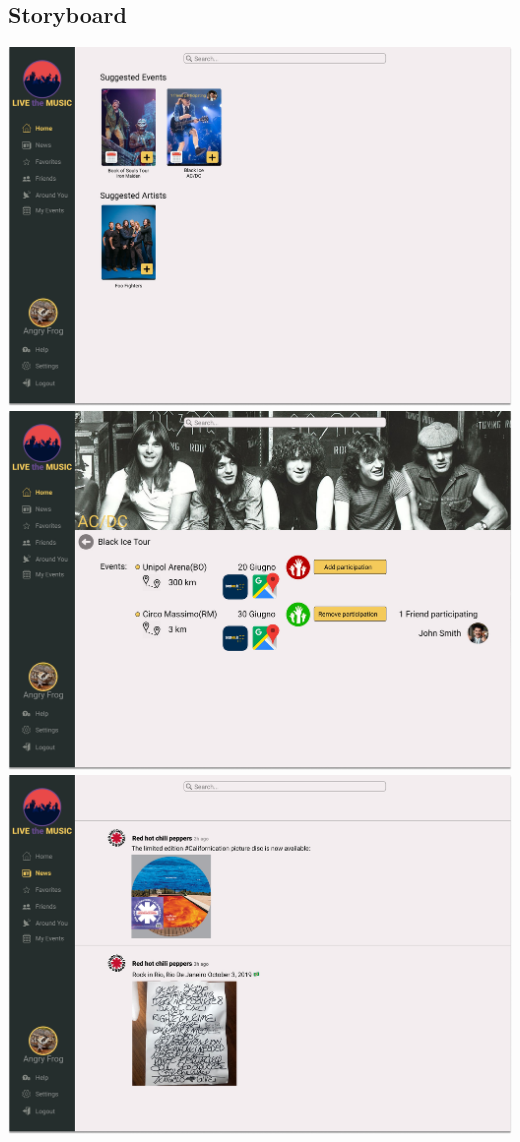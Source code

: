 \documentclass[11pt,a4paper]{article}
\begin{document}
\begin{itemize}
\section{Storyboard}
\includegraphics[scale=0.25]{Home.jpg}
\includegraphics[scale=0.25]{Concert.jpg}
\includegraphics[scale=0.25]{News.jpg}

\end{itemize}
\end{document}
